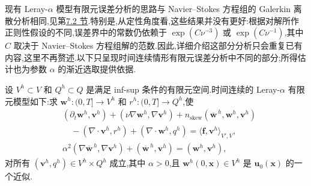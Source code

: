 \begin{note}
\label{note:leray-alpha-fem-error-analysis}
现有 Leray-$\alpha$ 模型有限元误差分析的思路与 Navier--Stokes 方程组的 Galerkin 离散分析相同,见第\hyperref[sec:time-dependent-fem-continuous]{7.2 节}.特别是,从定性角度看,这些结果并没有更好:根据对解所作正则性假设的不同,误差界中的常数仍依赖于 $\exp(C\nu^{-3})$ 或 $\exp(C\nu^{-1})$,其中 $C$ 取决于 Navier--Stokes 方程组解的范数.因此,详细介绍这部分分析只会重复已有内容,这里不再赘述.以下只呈现时间连续情形有限元误差分析中不同的部分;所得估计也为参数 $\alpha$ 的渐近选取提供依据.
\end{note}

\begin{note}
\label{note:leray-alpha-continuous-in-time-fem-model}
设 $V^h\subset V$ 和 $Q^h\subset Q$ 是满足 inf-sup 条件的有限元空间.时间连续的 Leray-$\alpha$ 有限元模型如下:求
$\bm{w}^h:(0,T]\to V^h$ 和 $r^h:(0,T]\to Q^h$,使
\begin{equation}\label{eq:leray-alpha-continuous-in-time-fem-model}
\begin{aligned}
 &(\partial_t\bm{w}^h,\bm{v}^h)
  +(\nu\nabla\bm{w}^h,\nabla\bm{v}^h)
  +n_{\mathrm{skew}}(\overline{\bm{w}}^{\,h},
                     \bm{w}^h,\bm{v}^h)\\
 &\quad-(\nabla\cdot\bm{v}^h,r^h)
       +(\nabla\cdot\bm{w}^h,q^h)
  =\langle\bm{f},\bm{v}^h\rangle_{V',V},\\
 &\alpha^2(\nabla\overline{\bm{w}}^{\,h},\nabla\bm{v}^h)
  +(\overline{\bm{w}}^{\,h},\bm{v}^h)
  =(\bm{w}^h,\bm{v}^h),
\end{aligned}
\end{equation}
对所有 $(\bm{v}^h,q^h)\in V^h\times Q^h$ 成立,其中 $\alpha>0$,且 $\bm{w}^h(0,\bm{x})\in V^h$ 是 $\bm{u}_0(\bm{x})$ 的一个近似.
\end{note}


